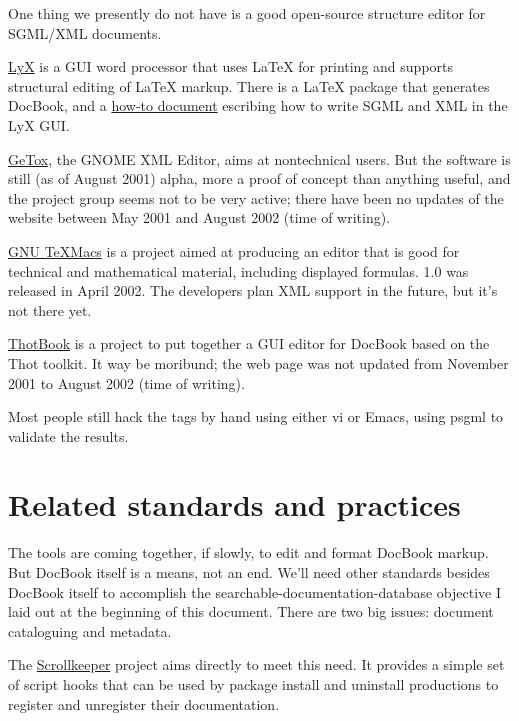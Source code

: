 \documentclass[pdftex,english,a4paper,10pt]{infocom}
\begin{document}
One thing we presently do not have is a good open-source
structure editor for SGML/XML documents.

\href{http://www.lyx.org/}{LyX} is a GUI word processor
that uses LaTeX for printing and supports structural editing of LaTeX
markup.  There is a LaTeX package that generates DocBook, and a
\href{http://bgu.chez.tiscali.fr/doc/db4lyx/}{how-to document}
escribing how to write SGML and XML in the LyX GUI.

\href{http://idx-getox.idealx.org/}{GeTox}, the
GNOME XML Editor, aims at nontechnical users.  But the software is
still (as of August 2001) alpha, more a proof of concept than anything
useful, and the project group seems not to be very active; there have
been no updates of the website between May 2001 and August 2002 (time of
writing).

\href{http://www.math.u-psud.fr/~anh/TeXmacs/TeXmacs.html}{ GNU
TeXMacs} is a project aimed at producing an editor that is good
for technical and mathematical material, including displayed formulas.
1.0 was released in April 2002.  The developers plan XML support in
the future, but it's not there yet.

\href{http://www.freesoftware.fsf.org/thotbook/}{ThotBook}
is a project to put together a GUI editor for DocBook based on
the Thot toolkit.  It way be moribund; the web page was not updated
from November 2001 to August 2002 (time of writing).

Most people still hack the tags by hand using either vi or Emacs, using
psgml to validate the results.

\section{Related standards and practices}
\label{id2717112}\hypertarget{id2717112}{}%

The tools are coming together, if slowly, to edit and format
DocBook markup. But DocBook itself is a means, not an end.  We'll need
other standards besides DocBook itself to accomplish the
searchable-documentation-database objective I laid out at the
beginning of this document. There are two big issues: document
cataloguing and metadata.

The \href{http://scrollkeeper.sourceforge.net/}{Scrollkeeper}
project aims directly to meet this need. It provides a simple set of
script hooks that can be used by package install and uninstall
productions to register and unregister their documentation.
\end{document}
